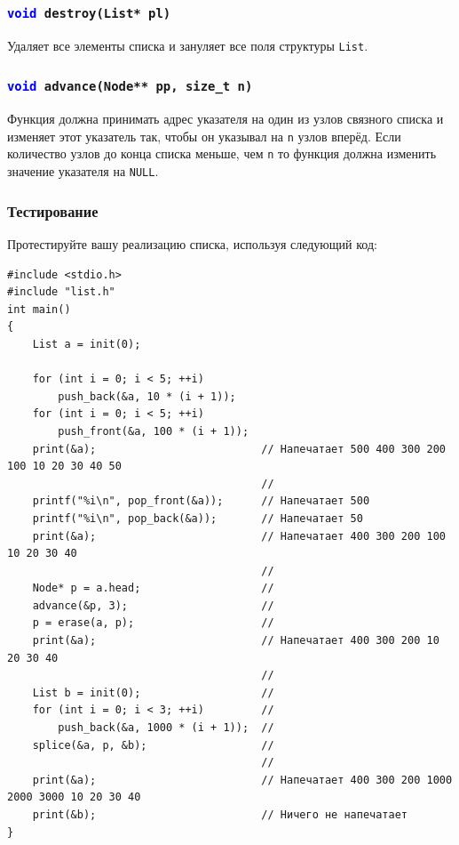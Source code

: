 \documentclass{article}
\begin{document}
\subsubsection{\texttt{\textcolor{blue}{void} destroy(List* pl)}}
Удаляет все элементы списка и зануляет все поля структуры \texttt{List}.


\subsubsection{\texttt{\textcolor{blue}{void} advance(Node** pp, size\_t n)}}
Функция должна принимать адрес указателя на один из узлов связного списка и изменяет этот указатель так, чтобы он указывал на \texttt{n} узлов вперёд. Если количество узлов до конца списка меньше, чем \texttt{n} то функция должна изменить значение указателя на \texttt{NULL}. 


\subsubsection{Тестирование}
Протестируйте вашу реализацию списка, используя следующий код:
\begin{lstlisting}
#include <stdio.h>
#include "list.h"
int main()
{
    List a = init(0);
    
    for (int i = 0; i < 5; ++i)
        push_back(&a, 10 * (i + 1));
    for (int i = 0; i < 5; ++i)
        push_front(&a, 100 * (i + 1));
    print(&a);                          // Напечатает 500 400 300 200 100 10 20 30 40 50
                                        //                
    printf("%i\n", pop_front(&a));      // Напечатает 500
    printf("%i\n", pop_back(&a));       // Напечатает 50
    print(&a);                          // Напечатает 400 300 200 100 10 20 30 40
                                        //            
    Node* p = a.head;                   //     
    advance(&p, 3);                     //
    p = erase(a, p);                    //
    print(&a);                          // Напечатает 400 300 200 10 20 30 40
                                        //            
    List b = init(0);                   //
    for (int i = 0; i < 3; ++i)         //
        push_back(&a, 1000 * (i + 1));  //
    splice(&a, p, &b);                  //
                                        //
    print(&a);                          // Напечатает 400 300 200 1000 2000 3000 10 20 30 40
    print(&b);                          // Ничего не напечатает
}

\end{lstlisting}
\end{document}
